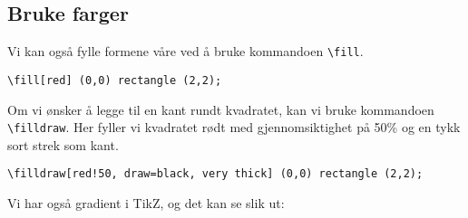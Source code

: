 \documentclass[12pt, a4paper]{article}
\begin{document}
\subsection{Bruke farger}
Vi kan også fylle formene våre ved å bruke kommandoen \texttt{\textbackslash fill}.

\begin{center}
\end{center}

\begin{Verbatim}[fontsize=\small]
\fill[red] (0,0) rectangle (2,2);
\end{Verbatim}

\noindent Om vi ønsker å legge til en kant rundt kvadratet, kan vi bruke kommandoen \texttt{\textbackslash filldraw}. Her fyller vi kvadratet rødt med gjennomsiktighet på 50\% og en tykk sort strek som kant.

\begin{center}
\end{center}

\begin{Verbatim}[fontsize=\small]
\filldraw[red!50, draw=black, very thick] (0,0) rectangle (2,2);
\end{Verbatim}

\noindent Vi har også gradient i TikZ, og det kan se slik ut:

\vspace{15pt}

\begin{center}
\begin{minipage}{0.3\textwidth}
\end{minipage}
\begin{minipage}{0.3\textwidth}
\end{minipage}
\begin{minipage}{0.3\textwidth}
\end{minipage}
\end{center}
\vspace{10pt}
\end{document}
